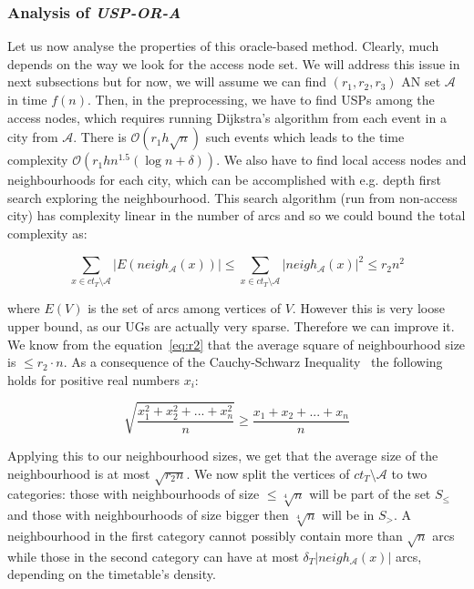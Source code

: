 	\subsubsection{Analysis of \textit{USP-OR-A}}
	
		\noindent Let us now analyse the properties of this oracle-based method. Clearly, much depends on the way we look for the access node set. We will address this issue in next subsections but for now, we will assume we can find $(r_{1}, r_{2}, r_{3})$ AN set $\mathcal{A}$ in time $f(n)$. Then, in the preprocessing, we have to find USPs among the access nodes, which requires running Dijkstra's algorithm from each event in a city from $\mathcal{A}$. There is $\mathcal{O}(r_{1}h\sqrt{n})$ such events which leads to the time complexity $\mathcal{O}(r_{1}hn^{1.5} (\log n + \delta))$. We also have to find local access nodes and neighbourhoods for each city, which can be accomplished with e.g. depth first search exploring the neighbourhood. This search algorithm (run from non-access city) has complexity linear in the number of arcs and so we could bound the total complexity as:
		
		$$
		\sum_{x \in ct_{T} \setminus \mathcal{A}} |E(neigh_{\mathcal{A}}(x))| 
		\leq \sum_{x \in ct_{T} \setminus \mathcal{A}} |neigh_{\mathcal{A}}(x)|^{2} 
		\leq r_{2} n^{2}
		$$
		
		\noindent where $E(V)$ is the set of arcs among vertices of $V$. However this is very loose upper bound, as our UGs are actually very sparse. Therefore we can improve it. We know from the equation~\ref{eq:r2} that the average square of neighbourhood size is $\leq r_{2} \cdot n$. As a consequence of the Cauchy-Schwarz Inequality~\cite{cauchy} the following holds for positive real numbers $x_{i}$:
		
		$$ 
		\sqrt{\frac{x_{1}^{2} + x_{2}^{2} + ... + x_{n}^{2}}{n}} 
		\geq \frac{x_{1} + x_{2} + ... + x_{n}}{n} $$
		
		\noindent Applying this to our neighbourhood sizes, we get that the average size of the neighbourhood is at most $\sqrt{r_{2}n}$.  We now split the vertices of $ct_{T} \setminus \mathcal{A}$ to two categories: those with neighbourhoods of size $\leq \sqrt[4]{n}$ will be part of the set $S_{\leq}$ and those with neighbourhoods of size bigger then $\sqrt[4]{n}$ will be in $S_{>}$. A neighbourhood in the first category cannot possibly contain more than $\sqrt{n}$ arcs while those in the second category can have at most $\delta_{T}|neigh_{\mathcal{A}}(x)|$ arcs, depending on the timetable's density.
		
